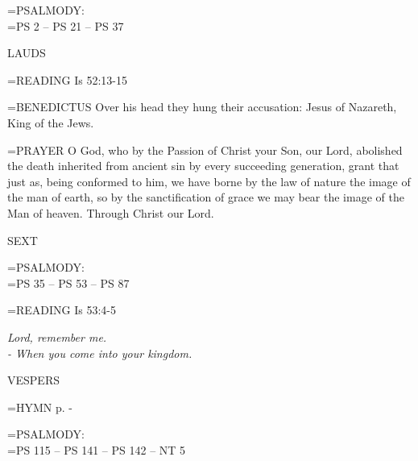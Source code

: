 \hangindent=\parindent \small{PSALMODY:}\\
\hangindent=\parindent  PS 2 -- PS 21 -- PS 37\vspace{0.5em}

\begin{flushleft}\normalsize LAUDS\\\end{flushleft}

\hangindent=\parindent \small{READING}    Is 52:13-15 \textbf{   \\}

\hangindent=\parindent \small{BENEDICTUS 	Over his head they hung their accusation: Jesus of Nazareth, King of the Jews.\\}

\hangindent=\parindent \small{PRAYER 	O God, who by the Passion of Christ your Son, our Lord, abolished the death inherited from ancient sin by every succeeding generation, grant that just as, being conformed to him, we have borne by the law of nature the image of the man of earth, so by the sanctification of grace we may bear the image of the Man of heaven. Through Christ our Lord.}

\begin{flushleft}\normalsize SEXT\\\end{flushleft}

\hangindent=\parindent \small{PSALMODY:}\\
\hangindent=\parindent  PS 35 -- PS 53 -- PS 87\vspace{0.5em}

\hangindent=\parindent \small{READING}    Is 53:4-5 \textbf{   }

\begin{center}
\textit{Lord, remember me.\\
- When you come into your kingdom.}
\end{center}

\begin{flushleft}\normalsize VESPERS\\\end{flushleft}

\hangindent=\parindent \small{\uppercase{HYMN} p.  \pageref{holyweek:firstHymn} - \pageref{holyweek:lastHymn}\\}

\hangindent=\parindent \small{PSALMODY:}\\
\hangindent=\parindent  PS 115 -- PS 141 -- PS 142 -- NT 5\vspace{0.5em}

